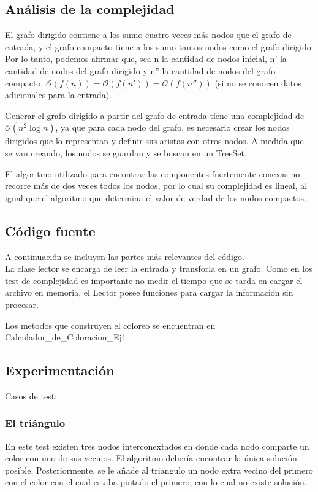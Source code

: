 \subsection{Análisis de la complejidad}
El grafo dirigido contiene a los sumo cuatro veces más nodos que el grafo de entrada, y el grafo compacto tiene a los sumo tantos nodos como el grafo dirigido. Por lo tanto, podemos afirmar que, sea n la cantidad de nodos inicial, n' la cantidad de nodos del grafo dirigido y n'' la cantidad de nodos del grafo compacto, $\mathcal{O}(f(n)) = \mathcal{O}(f(n')) = \mathcal{O}(f(n''))$ (si no se conocen datos adicionales para la entrada).

Generar el grafo dirigido a partir del grafo de entrada tiene una complejidad de $\mathcal{O}(n^2\log{n})$, ya que para cada nodo del grafo, es necesario crear los nodos dirigidos que lo representan y definir sus aristas con otros nodos. A medida que se van creando, los nodos se guardan y se buscan en un TreeSet.

El algoritmo utilizado para encontrar las componentes fuertemente conexas no recorre más de dos veces todos los nodos, por lo cual su complejidad es lineal, al igual que el algoritmo que determina el valor de verdad de los nodos compactos.

\subsection{Código fuente}

A continuación se incluyen las partes más relevantes del código.\\
La clase lector se encarga de leer la entrada y transforla en un grafo. Como en los test de complejidad es importante no medir el tiempo que se tarda en cargar el archivo en memoria, el Lector posee funciones para cargar la información sin procesar.

Los metodos que construyen el coloreo se encuentran en Calculador_de_Coloracion_Ej1 \\


\subsection{Experimentación}
Casos de test:
\subsubsection{El triángulo}
En este test existen tres nodos interconextados en donde cada nodo comparte un color con uno de sus vecinos. El algoritmo debería encontrar la única solución posible.
Posteriormente, se le añade al triangulo un nodo extra vecino del primero con el color con el cual estaba pintado el primero, con lo cual no existe solución.

